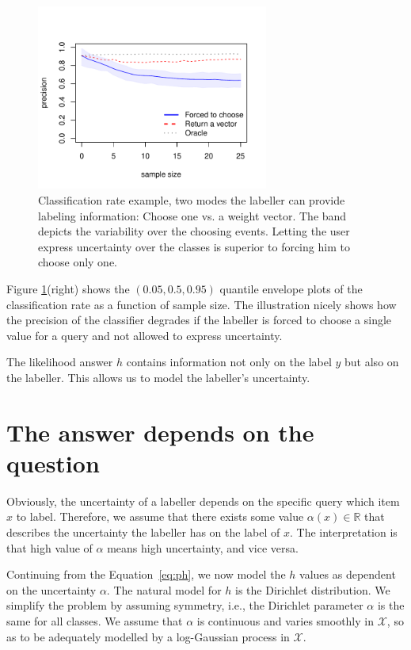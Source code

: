 \documentclass[10pt, onecolumn]{article}
\newcommand{\R}{\mathbb{R}}
\newcommand{\X}{\mathcal{X}}
\begin{document}
  
\begin{figure}[hbtp]
\centering
\includegraphics[width=3in]{figures/choose1_vs_give_vector.pdf}
\caption{Classification rate example, two modes the labeller can provide
  labeling information: Choose one vs. a weight vector. The band depicts the variability over the choosing events. Letting the user express uncertainty over the classes is superior to forcing him to choose only one.}
 \label{fig:sampling1}
\end{figure}

Figure \ref{fig:sampling1}(right)
shows the $(0.05, 0.5, 0.95)$ quantile envelope plots of the
classification rate as a function of sample size. The illustration nicely shows how the precision of the classifier degrades if the labeller is forced to choose a single value for a query and not allowed to express uncertainty. 

The likelihood answer $h$ contains information not only on the label $y$ but also on the labeller. This allows us to model the labeller's uncertainty.


\section{The answer depends on the question}
\label{sec:labeller}

Obviously, the uncertainty of a labeller depends on the specific query
which item $x$ to label. Therefore, we assume that there exists some value $\alpha(x)\in \R$ that describes the uncertainty the labeller has on the
label of $x$. The interpretation is that high value of $\alpha$
means high uncertainty, and vice versa. 

Continuing from the Equation~\ref{eq:ph}, we now model
the $h$ values as dependent on the uncertainty $\alpha$. The natural model for $h$ is the Dirichlet distribution. We simplify the problem by assuming symmetry,
i.e., the Dirichlet parameter $\alpha$ is the same for all classes. We assume that $\alpha$ is continuous and varies smoothly in $\X$, so as to be adequately modelled by a log-Gaussian process in $\X$.
\end{document}
